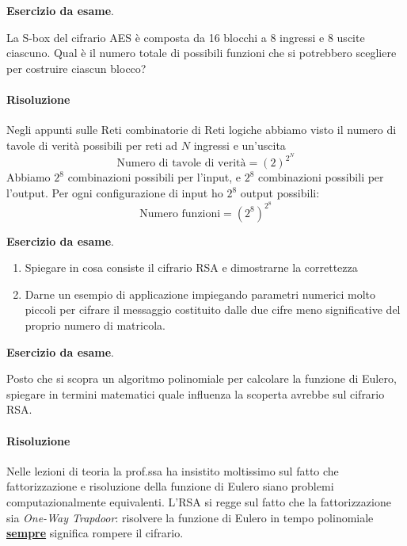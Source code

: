 \begin{framed}
	\noindent \textbf{Esercizio da esame}.
	
	\noindent La S-box del cifrario AES è composta da 16 blocchi a 8 ingressi e 8 uscite ciascuno. Qual è il	numero totale di possibili funzioni che si potrebbero scegliere per costruire ciascun blocco? 
	
	\paragraph{Risoluzione} Negli appunti sulle Reti combinatorie di Reti logiche abbiamo visto il numero di tavole di verità possibili per reti ad $N$ ingressi e un'uscita
	$$\text{Numero di tavole di verità}=(2)^{2^N}$$
	Abbiamo $2^8$ combinazioni possibili per l'input, e $2^8$ combinazioni possibili per l'output. Per ogni configurazione di input ho $2^8$ output possibili:
	$$\text{Numero funzioni}={\left(2^8\right)}^{2^8}$$
\end{framed} 



\begin{framed}
	\noindent \textbf{Esercizio da esame}.
	
	\begin{enumerate}
		\item Spiegare in cosa consiste il cifrario RSA e dimostrarne la correttezza
		\item Darne un esempio di applicazione impiegando parametri numerici molto piccoli per cifrare il
		messaggio costituito dalle due cifre meno significative del proprio numero di matricola.
	\end{enumerate}
\end{framed} 

\begin{framed}
	\noindent \textbf{Esercizio da esame}. 
	
	\noindent Posto che si scopra un algoritmo polinomiale per calcolare la funzione di Eulero, spiegare in
	termini matematici quale influenza la scoperta avrebbe sul cifrario RSA.
	
	\paragraph{Risoluzione} Nelle lezioni di teoria la prof.ssa ha insistito moltissimo sul fatto che fattorizzazione e risoluzione della funzione di Eulero siano problemi computazionalmente equivalenti. L'RSA si regge sul fatto che la fattorizzazione sia \emph{One-Way Trapdoor}: risolvere la funzione di Eulero in tempo polinomiale \textbf{\underline{sempre}} significa rompere il cifrario.
\end{framed} 

